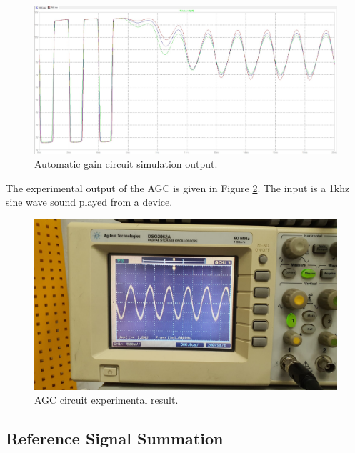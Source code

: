 \documentclass[a4paper,10pt]{IEEEtran}
\begin{document}
\begin{figure}[htbp!]
    \centering
    \includegraphics[width = 1\linewidth]{AGC Simulation Output.jpg}
    \caption{Automatic gain circuit simulation output.}
    \label{AGC_sim_output}
\end{figure} 
The experimental output of the AGC is given in Figure \ref{agc_osc}. The input is a 1khz sine wave sound played from a device.
\begin{figure}[H]
    \centering
    \includegraphics[width = 1\linewidth]{AGC_Experimental.jpeg}
    \caption{AGC circuit experimental result.}
    \label{agc_osc}
\end{figure} 
\subsection{Reference Signal Summation}
\end{document}
